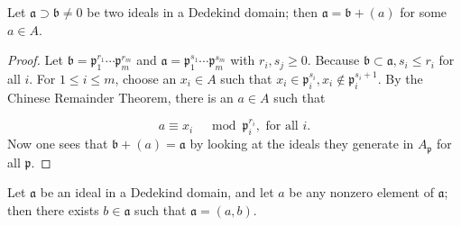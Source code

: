 \documentclass[12pt, oneside]{book}
\begin{document}
\begin{corollary}
    Let $\mathfrak{a} \supset \mathfrak{b} \neq 0$ be two ideals in a Dedekind domain; then $\mathfrak{a}=\mathfrak{b}+(a)$ for some $a \in A$.
    \begin{proof}
        Let $\mathfrak{b}=\mathfrak{p}_1^{r_1} \cdots \mathfrak{p}_m^{r_m}$ and $\mathfrak{a}=\mathfrak{p}_1^{s_1} \cdots \mathfrak{p}_m^{s_m}$ with $r_i, s_j \geq 0$. Because $\mathfrak{b} \subset \mathfrak{a}, s_i \leq r_i$ for all $i$. For $1 \leq i \leq m$, choose an $x_i \in A$ such that $x_i \in \mathfrak{p}_i^{s_i}, x_i \notin \mathfrak{p}_i^{s_i+1}$. By the Chinese Remainder Theorem, there is an $a \in A$ such that

        \begin{equation*}
            a \equiv x_i \quad \bmod \mathfrak{p}_i^{r_i}, \text { for all } i .
        \end{equation*}
        Now one sees that $\mathfrak{b}+(a)=\mathfrak{a}$ by looking at the ideals they generate in $A_{\mathfrak{p}}$ for all $\mathfrak{p}$.
    \end{proof}
\end{corollary}

\begin{corollary}
    Let $\mathfrak{a}$ be an ideal in a Dedekind domain, and let $a$ be any nonzero element of $\mathfrak{a}$; then there exists $b \in \mathfrak{a}$ such that $\mathfrak{a}=(a, b)$.
\end{corollary}
\end{document}
